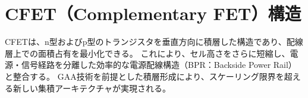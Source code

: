 \section{CFET（Complementary FET）構造}
CFETは、n型およびp型のトランジスタを垂直方向に積層した構造であり、配線層上での面積占有を最小化できる。  
これにより、セル高さをさらに短縮し、電源・信号経路を分離した効率的な電源配線構造（BPR：Backside Power Rail）と整合する。  
GAA技術を前提とした積層形成により、スケーリング限界を超える新しい集積アーキテクチャが実現される。
